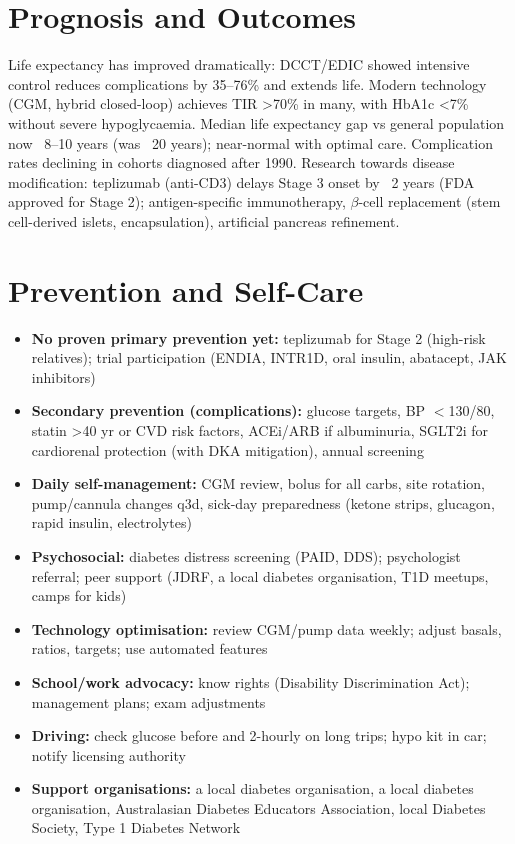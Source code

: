 \section*{Prognosis and Outcomes}
Life expectancy has improved dramatically: DCCT/EDIC showed intensive control reduces complications by 35--76\% and extends life. Modern technology (CGM, hybrid closed-loop) achieves TIR >70\% in many, with HbA1c <7\% without severe hypoglycaemia. Median life expectancy gap vs general population now ~8--10 years (was ~20 years); near-normal with optimal care. Complication rates declining in cohorts diagnosed after 1990. Research towards disease modification: teplizumab (anti-CD3) delays Stage 3 onset by ~2 years (FDA approved for Stage 2); antigen-specific immunotherapy, $\beta$-cell replacement (stem cell-derived islets, encapsulation), artificial pancreas refinement.

\section*{Prevention and Self-Care}
\begin{itemize}
    \item \textbf{No proven primary prevention yet:} teplizumab for Stage 2 (high-risk relatives); trial participation (ENDIA, INTR1D, oral insulin, abatacept, JAK inhibitors)
    \item \textbf{Secondary prevention (complications):} glucose targets, BP $<$130/80, statin >40 yr or CVD risk factors, ACEi/ARB if albuminuria, SGLT2i for cardiorenal protection (with DKA mitigation), annual screening
    \item \textbf{Daily self-management:} CGM review, bolus for all carbs, site rotation, pump/cannula changes q3d, sick-day preparedness (ketone strips, glucagon, rapid insulin, electrolytes)
    \item \textbf{Psychosocial:} diabetes distress screening (PAID, DDS); psychologist referral; peer support (JDRF, a local diabetes organisation, T1D meetups, camps for kids)
    \item \textbf{Technology optimisation:} review CGM/pump data weekly; adjust basals, ratios, targets; use automated features
    \item \textbf{School/work advocacy:} know rights (Disability Discrimination Act); management plans; exam adjustments
    \item \textbf{Driving:} check glucose before and 2-hourly on long trips; hypo kit in car; notify licensing authority
    \item \textbf{Support organisations:} a local diabetes organisation, a local diabetes organisation, Australasian Diabetes Educators Association, local Diabetes Society, Type 1 Diabetes Network
\end{itemize}

